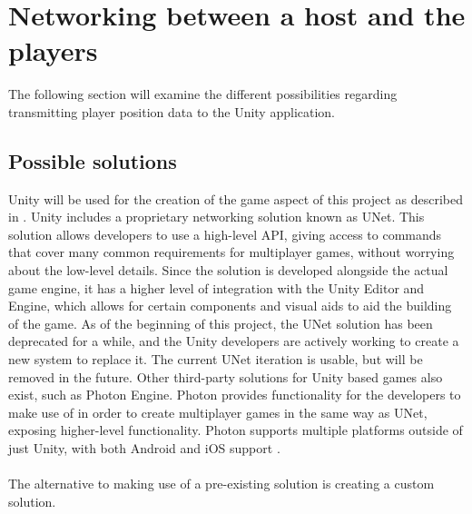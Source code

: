 \section{Networking between a host and the players}
The following section will examine the different possibilities regarding transmitting player position data to the Unity application.

\subsection{Possible solutions}
Unity will be used for the creation of the game aspect of this project as described in .
Unity includes a proprietary networking solution known as UNet\cite{unityunet}.
This solution allows developers to use a high-level API, giving access to commands that cover many common requirements for multiplayer games, without worrying about the low-level details.
Since the solution is developed alongside the actual game engine, it has a higher level of integration with the Unity Editor and Engine, which allows for certain components and visual aids to aid the building of the game.
As of the beginning of this project, the UNet solution has been deprecated for a while, and the Unity developers are actively working to create a new system to replace it.
The current UNet iteration is usable, but will be removed in the future.
Other third-party solutions for Unity based games also exist, such as Photon Engine.
Photon provides functionality for the developers to make use of in order to create multiplayer games in the same way as UNet, exposing higher-level functionality.
Photon supports multiple platforms outside of just Unity, with both Android and iOS support \cite{photonnet}.
\\\\
The alternative to making use of a pre-existing solution is creating a custom solution.


